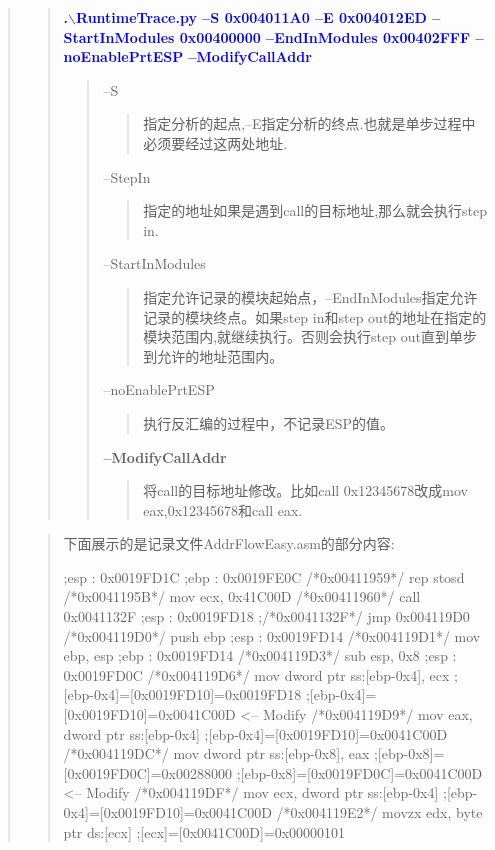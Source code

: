 \documentclass[AutoFakeBold,AutoFakeSlant]{article}
\begin{document}
\begin{flushleft}
\begin{quote}
\begin{quote}
			\clearpage			
			
			\textcolor{blue}{ \textbf{ \Large
			.$\backslash$RuntimeTrace.py --S 0x004011A0 --E 0x004012ED --StartInModules 0x00400000 --EndInModules 0x00402FFF --noEnablePrtESP --ModifyCallAddr }} \\
			\begin{quote}
				--S \begin{quote}指定分析的起点,--E指定分析的终点.也就是单步过程中必须要经过这两处地址.\end{quote}
				--StepIn \begin{quote}指定的地址如果是遇到call的目标地址,那么就会执行step in.\end{quote}
				--StartInModules \begin{quote}指定允许记录的模块起始点，--EndInModules指定允许记录的模块终点。如果step in和step out的地址在指定的模块范围内,就继续执行。否则会执行step out直到单步到允许的地址范围内。\end{quote}
				--noEnablePrtESP \begin{quote}执行反汇编的过程中，不记录ESP的值。\end{quote}
				\textbf{--ModifyCallAddr} \begin{quote}将call的目标地址修改。比如call 0x12345678改成mov eax,0x12345678和call eax. \end{quote}
			\end{quote}
			
			\end{quote}
		
			\newpage
		
			\begin{quote}
				下面展示的是记录文件AddrFlowEasy.asm的部分内容:
				\begin{x86asmcode}
;esp : 0x0019FD1C
;ebp : 0x0019FE0C
/*0x00411959*/    rep stosd
/*0x0041195B*/    mov ecx, 0x41C00D
/*0x00411960*/    call 0x0041132F
;esp : 0x0019FD18
;/*0x0041132F*/    jmp 0x004119D0
/*0x004119D0*/    push ebp
;esp : 0x0019FD14
/*0x004119D1*/    mov ebp, esp
;ebp : 0x0019FD14
/*0x004119D3*/    sub esp, 0x8
;esp : 0x0019FD0C
/*0x004119D6*/    mov dword ptr ss:[ebp-0x4], ecx
;[ebp-0x4]=[0x0019FD10]=0x0019FD18
;[ebp-0x4]=[0x0019FD10]=0x0041C00D  <-- Modify
/*0x004119D9*/    mov eax, dword ptr ss:[ebp-0x4]
;[ebp-0x4]=[0x0019FD10]=0x0041C00D
/*0x004119DC*/    mov dword ptr ss:[ebp-0x8], eax
;[ebp-0x8]=[0x0019FD0C]=0x00288000
;[ebp-0x8]=[0x0019FD0C]=0x0041C00D  <-- Modify
/*0x004119DF*/    mov ecx, dword ptr ss:[ebp-0x4]
;[ebp-0x4]=[0x0019FD10]=0x0041C00D
/*0x004119E2*/    movzx edx, byte ptr ds:[ecx]
;[ecx]=[0x0041C00D]=0x00000101
				\end{x86asmcode}
			\end{quote}
		\end{quote}
	\end{flushleft}
	
\end{document}
